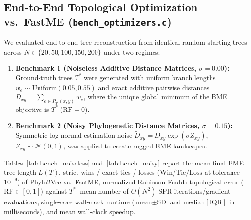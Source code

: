 \documentclass[11pt,a4paper]{article}
\theoremstyle{definition}
\begin{document}
\subsection{End-to-End Topological Optimization vs.\ FastME (\texttt{bench\_optimizers.c})}
We evaluated end-to-end tree reconstruction from identical random starting trees across $N \in \{20, 50, 100, 150, 200\}$ under two regimes:
\begin{enumerate}
    \item \textbf{Benchmark 1 (Noiseless Additive Distance Matrices, $\sigma = 0.00$):} Ground-truth trees $T^*$ were generated with uniform branch lengths $w_e \sim \text{Uniform}(0.05, 0.55)$ and exact additive pairwise distances $D_{xy} = \sum_{e \in P_{T^*}(x,y)} w_e$, where the unique global minimum of the BME objective is $T^*$ ($\text{RF} = 0$).
    \item \textbf{Benchmark 2 (Noisy Phylogenetic Distance Matrices, $\sigma = 0.15$):} Symmetric log-normal estimation noise $\tilde{D}_{xy} = D_{xy} \exp(\sigma Z_{xy})$, $Z_{xy} \sim \mathcal{N}(0, 1)$, was applied to create rugged BME landscapes.
\end{enumerate}

Tables~\ref{tab:bench_noiseless} and~\ref{tab:bench_noisy} report the mean final BME tree length $L(T)$, strict wins / exact ties / losses ($\text{Win/Tie/Loss}$ at tolerance $10^{-9}$) of Phylo2Vec vs.\ FastME, normalized Robinson-Foulds topological error ($\text{RF} \in [0, 1]$) against $T^*$, mean number of $O(N^2)$ SPR iterations/gradient evaluations, single-core wall-clock runtime ($\text{mean} \pm \text{SD}$ and $\text{median}[\text{IQR}]$ in milliseconds), and mean wall-clock speedup.
\end{document}
